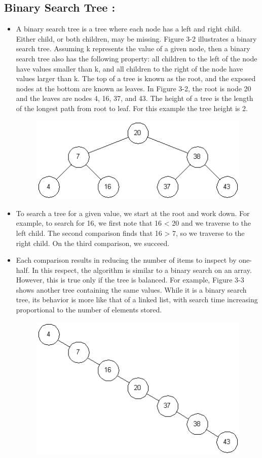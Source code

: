 \documentclass{article}
\begin{document}
\subsection{Binary Search Tree : }
	\begin{itemize}
		\item A binary search tree is a tree where each node has a left and right child. Either child, or both children, may be missing. Figure 3-2 illustrates a binary search tree. Assuming k represents the value of a given node, then a binary search tree also has the following property: all children to the left of the node have values smaller than k, and all children to the right of the node have values larger than k. The top of a tree is known as the root, and the exposed nodes at the bottom are known as leaves. In Figure 3-2, the root is node 20 and the leaves are nodes 4, 16, 37, and 43. The height of a tree is the length of the longest path from root to leaf. For this example the tree height is 2. 
\begin{figure}
\centering
	\includegraphics[scale = 0.8]{A1_01}
\end{figure}
    	\item To search a tree for a given value, we start at the root and work down. For example, to search for 16, we first note that 16 < 20 and we traverse to the left child. The second comparison finds that 16 > 7, so we traverse to the right child. On the third comparison, we succeed. 
        \item Each comparison results in reducing the number of items to inspect by one-half. In this respect, the algorithm is similar to a binary search on an array. However, this is true only if the tree is balanced. For example, Figure 3-3 shows another tree containing the same values. While it is a binary search tree, its behavior is more like that of a linked list, with search time increasing proportional to the number of elements stored. 
   	   	\begin{figure}
        \centering
			\includegraphics[scale = 0.8]{A1_02}
		\end{figure}

\end{itemize}
\end{document}
